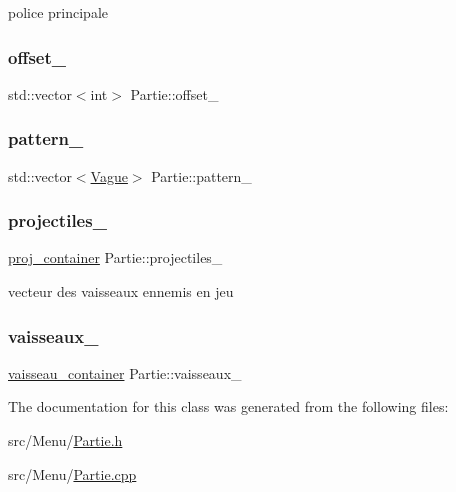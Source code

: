 police principale 

\mbox{\label{class_partie_af4b24b3fbc38c42ce0b5195f6ed4311c}} 
\subsubsection{\texorpdfstring{offset\+\_\+}{offset\_}}
{\footnotesize\ttfamily std\+::vector$<$int$>$ Partie\+::offset\+\_\+\hspace{0.3cm}{\ttfamily [protected]}}

\mbox{\label{class_partie_ab03632c60e33c4811178d9ce9c9454a9}} 
\subsubsection{\texorpdfstring{pattern\+\_\+}{pattern\_}}
{\footnotesize\ttfamily std\+::vector$<$\mbox{\hyperlink{class_vague}{Vague}}$>$ Partie\+::pattern\+\_\+\hspace{0.3cm}{\ttfamily [protected]}}

\mbox{\label{class_partie_afcd3073034167783fff10711df2dc036}} 
\subsubsection{\texorpdfstring{projectiles\+\_\+}{projectiles\_}}
{\footnotesize\ttfamily \mbox{\hyperlink{def__type_8h_a87980cd8ee9533e561a73e8bbc728188}{proj\+\_\+container}} Partie\+::projectiles\+\_\+\hspace{0.3cm}{\ttfamily [protected]}}



vecteur des vaisseaux ennemis en jeu 

\mbox{\label{class_partie_a1f6c75c92798030521ce18b970a0de2f}} 
\subsubsection{\texorpdfstring{vaisseaux\+\_\+}{vaisseaux\_}}
{\footnotesize\ttfamily \mbox{\hyperlink{def__type_8h_ad123ed7c93f42c8dd68e4af28b16b639}{vaisseau\+\_\+container}} Partie\+::vaisseaux\+\_\+\hspace{0.3cm}{\ttfamily [protected]}}



The documentation for this class was generated from the following files\+:\begin{DoxyCompactItemize}
\item 
src/\+Menu/\mbox{\hyperlink{_partie_8h}{Partie.\+h}}\item 
src/\+Menu/\mbox{\hyperlink{_partie_8cpp}{Partie.\+cpp}}\end{DoxyCompactItemize}
